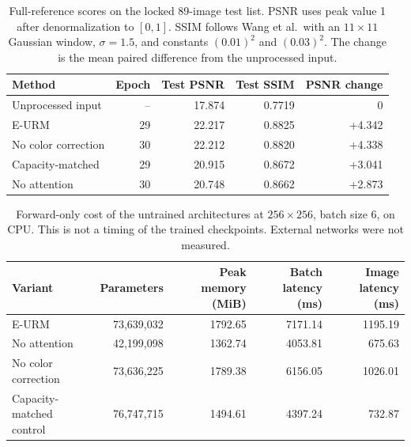 \begin{table}[ht]
\caption{Full-reference scores on the locked 89-image test list. PSNR uses peak value 1 after denormalization to $[0,1]$. SSIM follows Wang et al.\ with an $11\times11$ Gaussian window, $\sigma=1.5$, and constants $(0.01)^2$ and $(0.03)^2$. The change is the mean paired difference from the unprocessed input.}
\begin{tabular}{lrrrr}
\hline
Method & Epoch & Test PSNR & Test SSIM & PSNR change \\
\hline
Unprocessed input & -- & 17.874 & 0.7719 & 0 \\
E-URM & 29 & 22.217 & 0.8825 & +4.342 \\
No color correction & 30 & 22.212 & 0.8820 & +4.338 \\
Capacity-matched & 29 & 20.915 & 0.8672 & +3.041 \\
No attention & 30 & 20.748 & 0.8662 & +2.873 \\
\hline
\end{tabular}
\end{table}

\begin{table}[ht]
\caption{Forward-only cost of the untrained architectures at $256\times256$, batch size 6, on CPU. This is not a timing of the trained checkpoints. External networks were not measured.}
\begin{tabular}{lrrrr}
\hline
Variant & Parameters & Peak memory (MiB) & Batch latency (ms) & Image latency (ms) \\
\hline
E-URM & 73{,}639{,}032 & 1792.65 & 7171.14 & 1195.19 \\
No attention & 42{,}199{,}098 & 1362.74 & 4053.81 & 675.63 \\
No color correction & 73{,}636{,}225 & 1789.38 & 6156.05 & 1026.01 \\
Capacity-matched control & 76{,}747{,}715 & 1494.61 & 4397.24 & 732.87 \\
\hline
\end{tabular}
\end{table}

